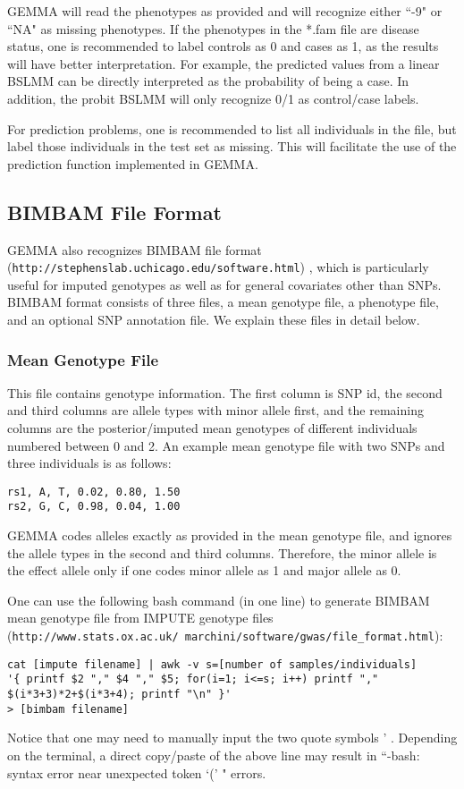 \documentclass[11pt]{article}
\providecommand{\url}[1]{\texttt{#1}}
\begin{document}
GEMMA will read the phenotypes as provided and will recognize either
``-9" or ``NA" as missing phenotypes. If the phenotypes in the *.fam
file are disease status, one is recommended to label controls as 0 and
cases as 1, as the results will have better interpretation. For
example, the predicted values from a linear BSLMM can be directly
interpreted as the probability of being a case.  In addition, the
probit BSLMM will only recognize 0/1 as control/case labels.

For prediction problems, one is recommended to list all individuals in
the file, but label those individuals in the test set as missing. This
will facilitate the use of the prediction function implemented in
GEMMA.

\subsection{BIMBAM File Format}

GEMMA also recognizes BIMBAM file format
(\url{http://stephenslab.uchicago.edu/software.html})
\cite{Guan:2008}, which is particularly useful for imputed genotypes
as well as for general covariates other than SNPs. BIMBAM format
consists of three files, a mean genotype file, a phenotype file, and
an optional SNP annotation file. We explain these files in detail
below.

\subsubsection{Mean Genotype File}

This file contains genotype information. The first column is SNP id,
the second and third columns are allele types with minor allele first,
and the remaining columns are the posterior/imputed mean genotypes of
different individuals numbered between 0 and 2. An example mean
genotype file with two SNPs and three individuals is as follows:
%
\begin{verbatim}
rs1, A, T, 0.02, 0.80, 1.50
rs2, G, C, 0.98, 0.04, 1.00
\end{verbatim}
%
GEMMA codes alleles exactly as provided in the mean genotype file, and
ignores the allele types in the second and third columns. Therefore,
the minor allele is the effect allele only if one codes minor allele
as 1 and major allele as 0.

One can use the following bash command (in one line) to generate
BIMBAM mean genotype file from IMPUTE genotype files
(\url{http://www.stats.ox.ac.uk/~marchini/software/gwas/file_format.html})\cite{Howie:2009}:
%
\begin{verbatim}
cat [impute filename] | awk -v s=[number of samples/individuals]
'{ printf $2 "," $4 "," $5; for(i=1; i<=s; i++) printf "," $(i*3+3)*2+$(i*3+4); printf "\n" }'
> [bimbam filename]
\end{verbatim}
%
Notice that one may need to manually input the two quote symbols '
. Depending on the terminal, a direct copy/paste of the above line may
result in ``-bash: syntax error near unexpected token `(' " errors.
\end{document}
